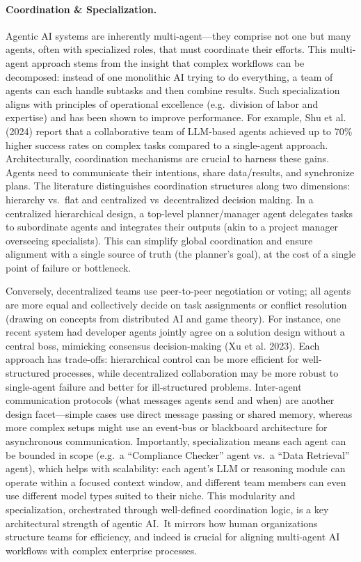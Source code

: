 \paragraph{Coordination \& Specialization.} Agentic AI systems are inherently multi-agent---they comprise not one but many agents, often with specialized roles, that must coordinate their efforts. This multi-agent approach stems from the insight that complex workflows can be decomposed: instead of one monolithic AI trying to do everything, a team of agents can each handle subtasks and then combine results. Such specialization aligns with principles of operational excellence (e.g.~division of labor and expertise) and has been shown to improve performance. For example, Shu et al. (2024) report that a collaborative team of LLM-based agents achieved up to 70\% higher success rates on complex tasks compared to a single-agent approach. Architecturally, coordination mechanisms are crucial to harness these gains. Agents need to communicate their intentions, share data/results, and synchronize plans. The literature distinguishes coordination structures along two dimensions: hierarchy vs.~flat and centralized vs~decentralized decision making. In a centralized hierarchical design, a top-level planner/manager agent delegates tasks to subordinate agents and integrates their outputs (akin to a project manager overseeing specialists). This can simplify global coordination and ensure alignment with a single source of truth (the planner's goal), at the cost of a single point of failure or
bottleneck.

Conversely, decentralized teams use peer-to-peer negotiation or voting; all agents are more equal and collectively decide on task assignments or conflict resolution (drawing on concepts from distributed AI and game theory). For instance, one recent system had developer agents jointly agree on a solution design without a central boss, mimicking consensus decision-making (Xu et al. 2023). Each approach has trade-offs: hierarchical control can be more efficient for well-structured processes, while
decentralized collaboration may be more robust to single-agent failure and better for ill-structured problems. Inter-agent communication protocols (what messages agents send and when) are another design facet---simple cases use direct message passing or shared memory, whereas more complex setups might use an event-bus or blackboard architecture for asynchronous communication.
Importantly, specialization means each agent can be bounded in scope (e.g.~a “Compliance Checker” agent vs.~a “Data Retrieval” agent), which helps with scalability: each agent's LLM or reasoning module can operate within a focused context window, and different team members can even use different model types suited to their niche. This modularity and specialization, orchestrated through well-defined coordination logic, is a key architectural strength of agentic AI.~It mirrors how human organizations
structure teams for efficiency, and indeed is crucial for aligning multi-agent AI workflows with complex enterprise processes. 

